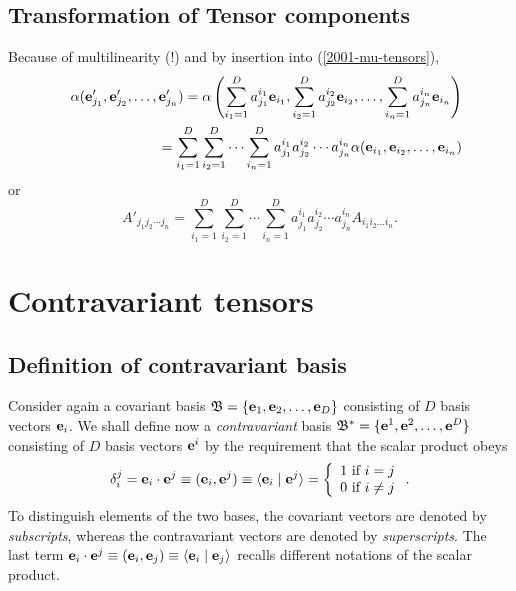 \subsection{Transformation of Tensor components}

Because of multilinearity (!) and by insertion into
(\ref{2001-mu-tensors}),
\begin{eqnarray}
&&\alpha ( {\bf e}'_{j_1},{\bf e}'_{j_2},\ldots ,{\bf e}'_{j_n})=
\alpha \left(
\sum_{i_1=1}^D a_{j_1}^{i_1} {\bf e}_{i_1},
\sum_{i_2=1}^D a_{j_2}^{i_2} {\bf e}_{i_2},
\ldots ,
\sum_{i_n=1}^D a_{j_n}^{i_n} {\bf e}_{i_n}
\right)
\nonumber \\&& \quad
=
\sum_{i_1=1}^D\sum_{i_2=1}^D\cdots \sum_{i_n=1}^D
a_{j_1}^{i_1}a_{j_2}^{i_2}\cdots a_{j_n}^{i_n} \alpha ( {\bf e}_{i_1},{\bf e}_{i_2},\ldots ,{\bf e}_{i_n})
\end{eqnarray}
or
\begin{equation}
A'_{{j_1}{j_2}\cdots {j_n}}=
\sum_{i_1=1}^D\sum_{i_2=1}^D\cdots \sum_{i_n=1}^D
a_{j_1}^{i_1}a_{j_2}^{i_2}\cdots a_{j_n}^{i_n} A_{i_1 i_2\ldots i_n}.
\end{equation}


\section{Contravariant tensors}

\subsection{Definition of contravariant basis}

Consider again a covariant basis
${\mathfrak B}=\{{\bf e}_1,{\bf e}_2,\ldots ,{\bf e}_D\}$ consisting of
$D$ basis vectors ${\bf e}_i$.
We shall define now a {\em contravariant} basis
${\mathfrak B^\ast}=\{{\bf e}^1,{\bf e}^2,\ldots ,{\bf e}^D\}$ consisting of
$D$ basis vectors ${\bf e}^i$
by the requirement that the scalar product obeys
\begin{equation}
\delta_i^j = {\bf e}_i\cdot {\bf e}^j\equiv ({\bf e}_i,{\bf e}^j)\equiv \langle {\bf e}_i\mid {\bf e}^j\rangle
 =\left\{
 \begin{array}{l}
1 \mbox{ if } i=j \\
0 \mbox{ if } i\neq j  \\
\end{array}
 \right. .
\label{2001-mu-tensors0}
\end{equation}
To distinguish elements of the two bases, the covariant vectors are denoted by {\em subscripts},
whereas the contravariant vectors are denoted by {\em superscripts}.
The last term ${\bf e}_i\cdot {\bf e}^j\equiv ({\bf e}_i,{\bf e}_j)\equiv \langle {\bf e}_i\mid {\bf e}_j\rangle $
recalls different notations of the scalar product.

